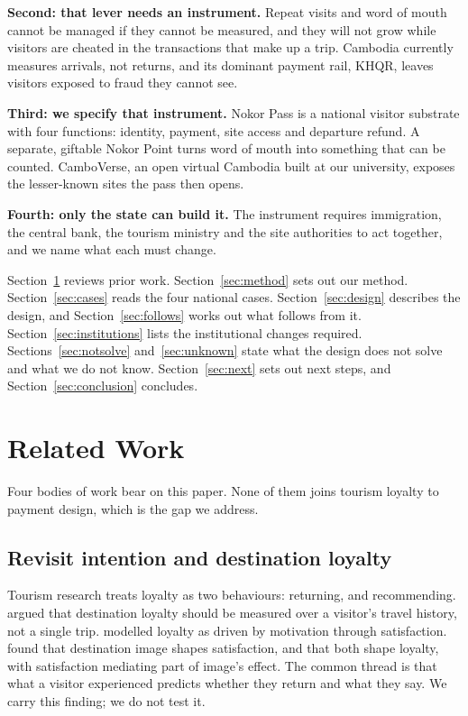 \documentclass[10pt,letterpaper,twocolumn]{article}
\newcommand{\runin}[1]{\textbf{#1}\quad}
\begin{document}
\runin{Second: that lever needs an instrument.} Repeat visits and word of mouth
cannot be managed if they cannot be measured, and they will not grow while
visitors are cheated in the transactions that make up a trip. Cambodia currently
measures arrivals, not returns, and its dominant payment rail, KHQR, leaves
visitors exposed to fraud they cannot see.

\runin{Third: we specify that instrument.} Nokor Pass is a national visitor
substrate with four functions: identity, payment, site access and departure
refund. A separate, giftable Nokor Point turns word of mouth into something that
can be counted. CamboVerse, an open virtual Cambodia built at our university,
exposes the lesser-known sites the pass then opens.

\runin{Fourth: only the state can build it.} The instrument requires
immigration, the central bank, the tourism ministry and the site authorities to
act together, and we name what each must change.

Section~\ref{sec:related} reviews prior work. Section~\ref{sec:method} sets out
our method. Section~\ref{sec:cases} reads the four national cases.
Section~\ref{sec:design} describes the design, and Section~\ref{sec:follows}
works out what follows from it. Section~\ref{sec:institutions} lists the
institutional changes required. Sections~\ref{sec:notsolve}
and~\ref{sec:unknown} state what the design does not solve and what we do not
know. Section~\ref{sec:next} sets out next steps, and
Section~\ref{sec:conclusion} concludes.

\section{Related Work}
\label{sec:related}

Four bodies of work bear on this paper. None of them joins tourism loyalty to
payment design, which is the gap we address.

\subsection{Revisit intention and destination loyalty}

Tourism research treats loyalty as two behaviours: returning, and
recommending. \citet{oppermann2000} argued that destination loyalty should be
measured over a visitor's travel history, not a single trip.
\citet{yoon2005} modelled loyalty as driven by motivation through satisfaction.
\citet{chi2008} found that destination image shapes satisfaction, and that both
shape loyalty, with satisfaction mediating part of image's effect. The common
thread is that what a visitor experienced predicts whether they return and what
they say. We carry this finding; we do not test it.
\end{document}

